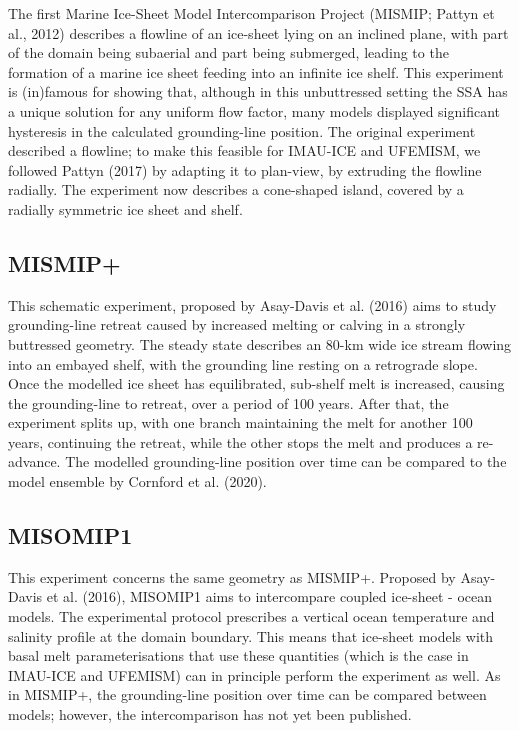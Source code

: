 \documentclass{article}
\begin{document}
The first Marine Ice-Sheet Model Intercomparison Project (MISMIP; Pattyn et al., 2012) describes a flowline of an ice-sheet lying on an inclined plane, with part of the domain being subaerial and part being submerged, leading to the formation of a marine ice sheet feeding into an infinite ice shelf. This experiment is (in)famous for showing that, although in this unbuttressed setting the SSA has a unique solution for any uniform flow factor, many models displayed significant hysteresis in the calculated grounding-line position. The original experiment described a flowline; to make this feasible for IMAU-ICE and UFEMISM, we followed Pattyn (2017) by adapting it to plan-view, by extruding the flowline radially. The experiment now describes a cone-shaped island, covered by a radially symmetric ice sheet and shelf.

\subsection{MISMIP+}

This schematic experiment, proposed by Asay-Davis et al. (2016) aims to study grounding-line retreat caused by increased melting or calving in a strongly buttressed geometry. The steady state describes an 80-km wide ice stream flowing into an embayed shelf, with the grounding line resting on a retrograde slope. Once the modelled ice sheet has equilibrated, sub-shelf melt is increased, causing the grounding-line to retreat, over a period of 100 years. After that, the experiment splits up, with one branch maintaining the melt for another 100 years, continuing the retreat, while the other stops the melt and produces a re-advance. The modelled grounding-line position over time can be compared to the model ensemble by Cornford et al. (2020).

\subsection{MISOMIP1}

This experiment concerns the same geometry as MISMIP+. Proposed by Asay-Davis et al. (2016), MISOMIP1 aims to intercompare coupled ice-sheet - ocean models. The experimental protocol prescribes a vertical ocean temperature and salinity profile at the domain boundary. This means that ice-sheet models with basal melt parameterisations that use these quantities (which is the case in IMAU-ICE and UFEMISM) can in principle perform the experiment as well. As in MISMIP+, the grounding-line position over time can be compared between models; however, the intercomparison has not yet been published.
\end{document}
